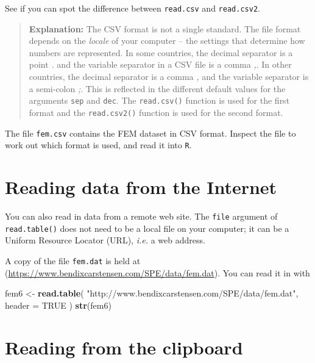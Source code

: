 \documentclass[
]{book}
\newenvironment{Shaded}{\begin{snugshade}}{\end{snugshade}}
\newcommand{\AttributeTok}[1]{\textcolor[rgb]{0.13,0.29,0.53}{#1}}
\newcommand{\ConstantTok}[1]{\textcolor[rgb]{0.56,0.35,0.01}{#1}}
\newcommand{\FunctionTok}[1]{\textcolor[rgb]{0.13,0.29,0.53}{\textbf{#1}}}
\newcommand{\NormalTok}[1]{#1}
\newcommand{\OtherTok}[1]{\textcolor[rgb]{0.56,0.35,0.01}{#1}}
\newcommand{\StringTok}[1]{\textcolor[rgb]{0.31,0.60,0.02}{#1}}
\begin{document}
See if you can spot the difference between \texttt{read.csv} and
\texttt{read.csv2}.

\begin{quote}
\textbf{Explanation:} The CSV format is not a single standard. The
file format depends on the \emph{locale} of your computer -- the
settings that determine how numbers are represented. In some
countries, the decimal separator is a point \emph{.} and the variable
separator in a CSV file is a comma \emph{,}. In other countries, the
decimal separator is a comma \emph{,} and the variable separator is a
semi-colon \emph{;}. This is reflected in the different default values
for the arguments \texttt{sep} and \texttt{dec}. The
\texttt{read.csv()} function is used for the first format and the
\texttt{read.csv2()} function is used for the second format.
\end{quote}

The file \texttt{fem.csv} contains the FEM dataset in CSV format.
Inspect the file to work out which format is used, and read it into
\texttt{R}.

\section{Reading data from the Internet}\label{reading-data-from-the-internet}

You can also read in data from a remote web site. The \texttt{file}
argument of \texttt{read.table()} does not need to be a local file on
your computer; it can be a Uniform Resource Locator (URL), \emph{i.e.}
a web address.

A copy of the file \texttt{fem.dat} is held at
(\url{https://www.bendixcarstensen.com/SPE/data/fem.dat}). You can
read it in with

\begin{Shaded}
\begin{Highlighting}[]
\NormalTok{fem6 }\OtherTok{\textless{}{-}} 
  \FunctionTok{read.table}\NormalTok{(}
    \StringTok{"http://www.bendixcarstensen.com/SPE/data/fem.dat"}\NormalTok{,}
    \AttributeTok{header =} \ConstantTok{TRUE}
\NormalTok{  )}
\FunctionTok{str}\NormalTok{(fem6)}
\end{Highlighting}
\end{Shaded}

\section{Reading from the clipboard}\label{reading-from-the-clipboard}
\end{document}
